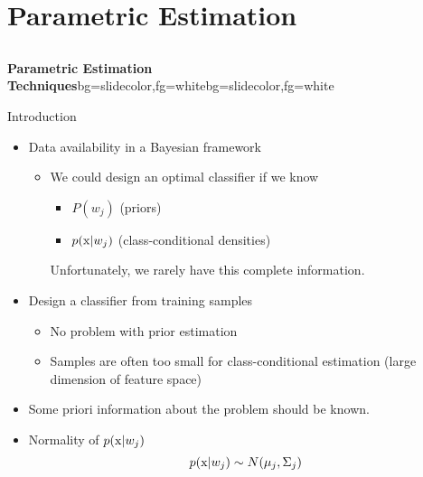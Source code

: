 \section{Parametric Estimation}
\subsection{}

\begin{frame}{}
\begin{variableblock}{\centering \Large \textbf{\vspace{4pt}\newline Parametric Estimation Techniques\vspace{4pt}}}{bg=slidecolor,fg=white}{bg=slidecolor,fg=white}
\end{variableblock}
\end{frame}

\begin{frame}{Introduction}
\begin{itemize}
\item Data availability in a Bayesian framework
\begin{itemize}
\item We could design an optimal classifier if we know
\begin{itemize}
\item $P(w_j)$ (priors)
\item $p({\rm x}|w_j)$ (class-conditional densities)
\end{itemize}
Unfortunately, we rarely have this complete information.
\end{itemize}
\item Design a classifier from training samples
\begin{itemize}
\item No problem with prior estimation
\item Samples are often too small for class-conditional estimation (large dimension of feature space)
\end{itemize}
\item Some priori information about the problem should be known.
\item Normality of $p({\rm x}|w_j)$
\begin{equation}
p({\rm x}|w_j)\sim N(\mu_j,\Sigma_j)\nonumber
\end{equation}
\end{itemize}
\end{frame}

